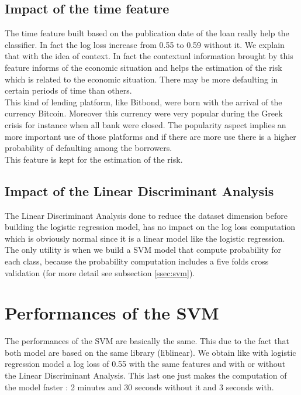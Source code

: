 	\subsection{Impact of the time feature}
		The time feature built based on the publication date of the loan really help the classifier. In fact the log loss increase from 0.55 to 0.59 without it. We explain that with the idea of context. In fact the contextual information brought by this feature informs of the economic situation and helps the estimation of the risk which is related to the economic situation. There may be more defaulting in certain periods of time than others.\\

		This kind of lending platform, like Bitbond, were born with the arrival of the currency Bitcoin. Moreover this currency were very popular during the Greek crisis for instance when all bank were closed. The popularity aspect implies an more important use of those platforms and if there are more use there is a higher probability of defaulting among the borrowers.\\

		This feature is kept for the estimation of the risk.

	\subsection{Impact of the Linear Discriminant Analysis}
		The Linear Discriminant Analysis done to reduce the dataset dimension before building the logistic regression model, has no impact on the log loss computation which is obviously normal since it is a linear model like the logistic regression. The only utility is when we build a SVM model that compute probability for each class, because the probability computation includes a five folds cross validation (for more detail see subsection \ref{ssec:svm}).

\section{Performances of the SVM}
	The performances of the SVM are basically the same. This due to the fact that both model are based on the same library (liblinear). We obtain like with logistic regression model a log loss of 0.55 with the same features and with or without the Linear Discriminant Analysis. This last one just makes the computation of the model faster : 2 minutes and 30 seconds without it and 3 seconds with.

